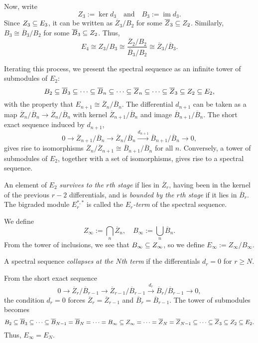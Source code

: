 \documentclass{MetricNotes2023}
\def\subq{\ensuremath\subseteq}
\DeclareMathOperator{\im}{im}
\begin{document}
Now, write 
\[Z_3:=\ker d_3 \quad \text{and} \quad B_3:=\im d_3.\]
Since \(Z_3\subq E_3\), it can be written as \(\overline{Z}_3/B_2\) for some \(\overline{Z}_3\subq Z_2\). Similarly, \(B_3\cong \overline B_3/B_2\) for some \(\overline B_3\subq Z_2\). Thus,
\[E_4\cong Z_3/B_3\cong \frac{\overline Z_2/B_2}{\overline B_3/B_2}\cong \overline Z_3/\overline B_3.\]

Iterating this process, we present the spectral sequence as an infinite tower of submodules of \(E_2\):
\[B_2\subq \overline B_3\subq \cdots \subq \overline B_n\subq \cdots \subq \overline Z_n\subq \cdots \subq \overline Z_3\subq Z_2\subq E_2,\]
with the property that \(E_{n+1}\cong \overline Z_n/\overline B_n\). The differential \(d_{n+1}\) can be taken as a map \(\overline Z_n/\overline B_n\to\overline Z_n/\overline B_n\) with kernel \(\overline Z_{n+1}/\overline B_n\) and image \(\overline B_{n+1}/\overline B_n\). The short exact sequence induced by \(d_{n+1}\),
\[0 \to \overline Z_{n+1}/\overline B_n\to \overline Z_n/\overline B_n \xrightarrow{d_{n+1}} \overline B_{n+1}/\overline{B}_n\to 0,\]
gives rise to isomorphisms \(\overline{Z}_n/\overline{Z}_{n+1}\cong \overline{B}_{n+1}/\overline{B}_n\) for all \(n\). Conversely, a tower of submodules of \(E_2\), together with a set of isomorphisms, gives rise to a spectral sequence. 

\begin{definition}
An element of \(E_2\) \textit{survives to the \(r\)th stage} if lies in \(\overline{Z}_r\), having been in the kernel of the previous \(r-2\) differentials, and is \textit{bounded by the \(r\)th stage} if it lies in \(\overline{B}_r\). The bigraded module \(E_r^{*,*}\) is called the \textit{\(E_r\)-term} of the spectral sequence. 
\end{definition}

We define 
\[Z_\infty:= \bigcap_n \overline{Z}_n, \quad B_\infty:=\bigcup_n \overline{B}_n.\]
From the tower of inclusions, we see that \(B_\infty\subq Z_\infty\), so we define \(E_\infty:=Z_\infty/B_\infty\). 

\begin{definition}
A spectral sequence \textit{collapses at the \(N\)th term} if the differentials \(d_r=0\) for \(r\geq N\). 
\end{definition}

From the short exact sequence 
\[0 \to \overline Z_{r}/\overline B_{r-1}\to \overline Z_{r-1}/\overline B_{r-1} \xrightarrow{d_{r}} \overline B_{r}/\overline{B}_{r-1}\to 0,\]
the condition \(d_r=0\) forces  \(\overline{Z}_r=\overline{Z}_{r-1}\) and \(\overline{B}_r=\overline{B}_{r-1}\). The tower of submodules becomes
\[B_2\subq \overline B_3\subq \cdots \subq \overline B_{N-1}=\overline B_N= \cdots=B_\infty \subq Z_\infty= \cdots = \overline Z_N=\overline Z_{N-1}\subq \cdots \subq \overline Z_3\subq Z_2\subq E_2.\]
Thus, \(E_\infty=E_N\). 
\end{document}
